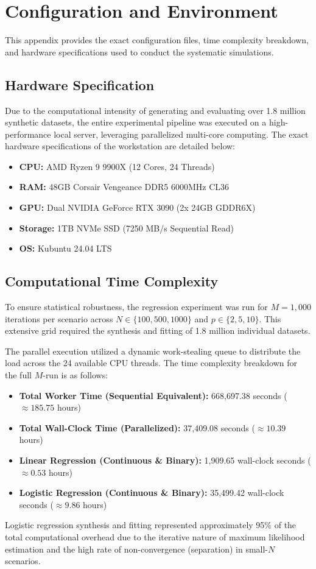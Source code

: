 \chapter{Configuration and Environment}
\label{chap:appendices}

This appendix provides the exact configuration files, time complexity breakdown, and hardware specifications used to conduct the systematic simulations.

\section{Hardware Specification}
\label{sec:app-hardware}
Due to the computational intensity of generating and evaluating over 1.8 million synthetic datasets, the entire experimental pipeline was executed on a high-performance local server, leveraging parallelized multi-core computing. The exact hardware specifications of the workstation are detailed below:
\begin{itemize}
    \item \textbf{CPU:} AMD Ryzen 9 9900X (12 Cores, 24 Threads)
    \item \textbf{RAM:} 48GB Corsair Vengeance DDR5 6000MHz CL36
    \item \textbf{GPU:} Dual NVIDIA GeForce RTX 3090 (2x 24GB GDDR6X)
    \item \textbf{Storage:} 1TB NVMe SSD (7250 MB/s Sequential Read)
    \item \textbf{OS:} Kubuntu 24.04 LTS
\end{itemize}

\section{Computational Time Complexity}
\label{sec:app-time-complexity}
To ensure statistical robustness, the regression experiment was run for $M = 1,000$ iterations per scenario across $N \in \{100, 500, 1000\}$ and $p \in \{2, 5, 10\}$. This extensive grid required the synthesis and fitting of 1.8 million individual datasets.

The parallel execution utilized a dynamic work-stealing queue to distribute the load across the 24 available CPU threads. The time complexity breakdown for the full $M$-run is as follows:
\begin{itemize}
    \item \textbf{Total Worker Time (Sequential Equivalent):} 668,697.38 seconds ($\approx 185.75$ hours)
    \item \textbf{Total Wall-Clock Time (Parallelized):} 37,409.08 seconds ($\approx 10.39$ hours)
    \item \textbf{Linear Regression (Continuous \& Binary):} 1,909.65 wall-clock seconds ($\approx 0.53$ hours)
    \item \textbf{Logistic Regression (Continuous \& Binary):} 35,499.42 wall-clock seconds ($\approx 9.86$ hours)
\end{itemize}
Logistic regression synthesis and fitting represented approximately 95\% of the total computational overhead due to the iterative nature of maximum likelihood estimation and the high rate of non-convergence (separation) in small-$N$ scenarios.

